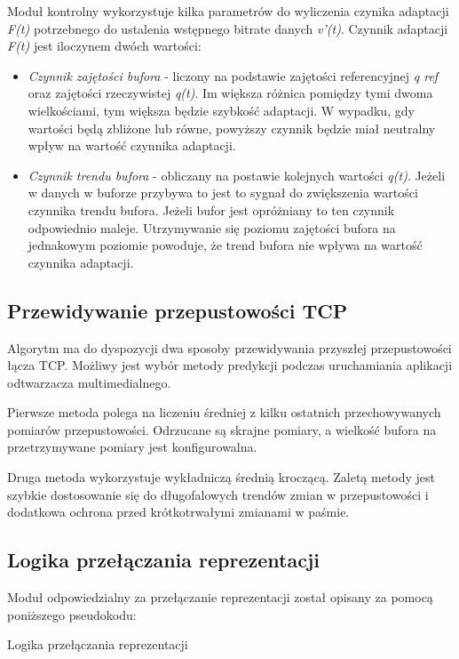 Moduł kontrolny wykorzystuje kilka parametrów do wyliczenia czynika adaptacji \textit{F(t)} potrzebnego do ustalenia wstępnego bitrate danych \textit{v'(t)}. Czynnik adaptacji \textit{F(t)} jest iloczynem dwóch wartości:
\begin{itemize}
\item \textit{Czynnik zajętości bufora} - liczony na podstawie zajętości referencyjnej \textit{q ref} oraz zajętości rzeczywistej \textit{q(t)}. Im większa różnica pomiędzy tymi dwoma wielkościami, tym większa będzie szybkość adaptacji. W wypadku, gdy wartości będą zbliżone lub równe, powyższy czynnik będzie miał neutralny wpływ na wartość czynnika adaptacji. 
\item \textit{Czynnik trendu bufora} - obliczany na postawie kolejnych wartości \textit{q(t)}. Jeżeli w danych w buforze przybywa to jest to sygnał do zwiększenia wartości czynnika trendu bufora. Jeżeli bufor jest opróżniany to ten czynnik odpowiednio maleje. Utrzymywanie się poziomu zajętości bufora na jednakowym poziomie powoduje, że trend bufora nie wpływa na wartość czynnika adaptacji.
\end{itemize}

\subsection{Przewidywanie przepustowości TCP}

Algorytm ma do dyspozycji dwa sposoby przewidywania przyszłej przepustowości łącza TCP. Możliwy jest wybór metody predykcji podczas uruchamiania aplikacji odtwarzacza multimedialnego.

Pierwsze metoda polega na liczeniu średniej z kilku ostatnich przechowywanych pomiarów przepustowości. Odrzucane są skrajne pomiary, a wielkość bufora na przetrzymywane pomiary jest konfigurowalna.

Druga metoda wykorzystuje wykładniczą średnią kroczącą. Zaletą metody jest szybkie dostosowanie się do długofalowych trendów zmian w przepustowości i dodatkowa ochrona przed krótkotrwałymi zmianami w paśmie.

\subsection{Logika przełączania reprezentacji}

Moduł odpowiedzialny za przełączanie reprezentacji został opisany za pomocą poniższego pseudokodu:

\begin{algorithm}
\label{alg:switch}
\caption{Logika przełączania reprezentacji}
\begin{algorithmic}[1]
	\EndIf
{}
\EndIf
{}
\end{algorithmic}
\end{algorithm}

